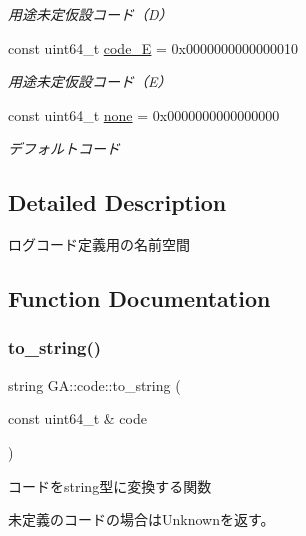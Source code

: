 \begin{DoxyCompactItemize}
\begin{DoxyCompactList}\small\item\em 用途未定仮設コード（\+D） \end{DoxyCompactList}\item 
\mbox{\label{namespace_g_a_1_1code_a2cafc349b273970f5cbbaece452e48da}} 
const uint64\+\_\+t \mbox{\hyperlink{namespace_g_a_1_1code_a2cafc349b273970f5cbbaece452e48da}{code\+\_\+E}} = 0x00\textquotesingle{}00\textquotesingle{}00\textquotesingle{}00\textquotesingle{}00\textquotesingle{}00\textquotesingle{}00\textquotesingle{}10
\begin{DoxyCompactList}\small\item\em 用途未定仮設コード（\+E） \end{DoxyCompactList}\item 
\mbox{\label{namespace_g_a_1_1code_af8cbb1bc81d68690746249ddbf4a238a}} 
const uint64\+\_\+t \mbox{\hyperlink{namespace_g_a_1_1code_af8cbb1bc81d68690746249ddbf4a238a}{none}} = 0x00\textquotesingle{}00\textquotesingle{}00\textquotesingle{}00\textquotesingle{}00\textquotesingle{}00\textquotesingle{}00\textquotesingle{}00
\begin{DoxyCompactList}\small\item\em デフォルトコード \end{DoxyCompactList}\end{DoxyCompactItemize}


\subsection{Detailed Description}
ログコード定義用の名前空間 



\subsection{Function Documentation}
\mbox{\label{namespace_g_a_1_1code_abc5de9a375bbfb29df3bfee41dbe8c60}} 
\subsubsection{\texorpdfstring{to\_string()}{to\_string()}}
{\footnotesize\ttfamily string G\+A\+::code\+::to\+\_\+string (\begin{DoxyParamCaption}\item[{const uint64\+\_\+t \&}]{code }\end{DoxyParamCaption})}



コードをstring型に変換する関数 

未定義のコードの場合は\+Unknownを返す。 